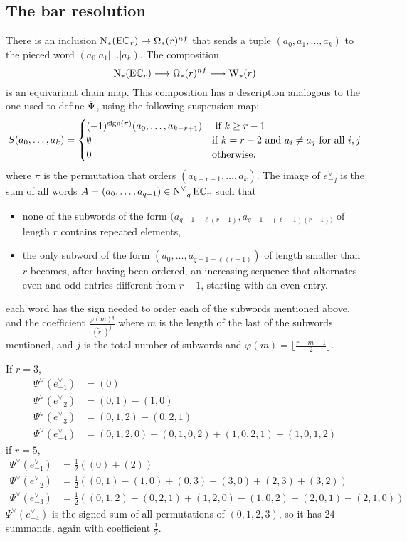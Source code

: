 
\subsection{The bar resolution}\label{ss:milnor}
There is an inclusion $\chains(\EC_r)\to \Omega_*(r)^{\nf}$ that sends a tuple $(a_0,a_1,\ldots,a_k)$ to the pieced word $(a_0|a_1|\ldots|a_k)$. The composition
\[
\chains(\EC_r)\lra \Omega_*(r)^{\nf}\lra \rW(r)
\]
is an equivariant chain map. This composition has a description analogous to the one used to define $\Psiom$, using the following suspension map:
\[
S(a_0,\ldots,a_k) = \begin{cases}
	(-1)^{\sign{\perm}} (a_{0},\ldots,a_{k-r+1}) & \text{ if $k\geq r-1$} \\
	\emptyset & \text{if $k = r-2$ and $a_i\neq a_j$ for all $i,j$} \\
	0 & \text{otherwise.}
\end{cases}
\]
where $\pi$ is the permutation that orders $(a_{k-r+1},\ldots,a_{k})$. The image of $e_{-q}^{\vee}$ is the sum of all words $A = (a_0,\ldots,a_{q-1})\in \cochains[-q] \EC_r$ such that
\begin{itemize}
\item none of the subwords of the form $(a_{q-1-\ell(r-1)},a_{q-1-(\ell-1)(r-1))}$ of length $r$ contains repeated elements,
\item the only subword of the form $(a_0,\ldots,a_{q-1-\ell(r-1)})$ of length smaller than $r$ becomes, after having been ordered, an increasing sequence that alternates even and odd entries different from $r-1$, starting with an even entry.
\end{itemize}
each word has the sign needed to order each of the subwords mentioned above, and the coefficient $\frac{\varphi(m)!}{(\tilde{r}!)^j}$ where $m$ is the length of the last of the subwords mentioned, and $j$ is the total number of subwords and $\varphi(m) = \lfloor\frac{r-m-1}{2}\rfloor$.
\begin{example} If $r=3$,
\begin{align*}
	\Psi^\vee(e_{-1}^\vee) &= (0)
	\\
	\Psi^\vee(e_{-2}^{\vee}) &= (0,1)-(1,0)
	\\
	\Psi^\vee(e_{-3}^{\vee}) &= (0,1,2) - (0,2,1)
\\
	\Psi^\vee(e_{-4}^{\vee}) &= (0,1,2,0) - (0,1,0,2) + (1,0,2,1) - (1,0,1,2)
\end{align*}
if $r= 5$,
\begin{align*}
	\Psi^\vee(e^\vee_{-1}) &= \frac{1}{2}\left((0) + (2)\right)
	\\
	\Psi^\vee(e^\vee_{-2}) &= \frac{1}{2}\left((0,1) - (1,0) + (0,3) - (3,0) + (2,3) + (3,2)\right)
	\\
	\Psi^\vee(e^\vee_{-3}) &= \frac{1}{2}\left((0,1,2) -(0,2,1) + (1,2,0) - (1,0,2) + (2,0,1) - (2,1,0)\right)
\end{align*}
$\Psi^\vee(e^\vee_{-4})$ is the signed sum of all permutations of $(0,1,2,3)$, so it has $24$ summands, again with coefficient $\frac{1}{2}$.
\end{example}

